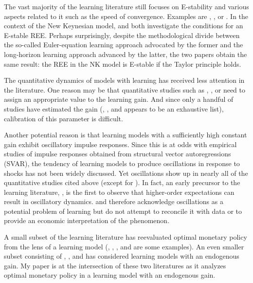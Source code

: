 \documentclass[11pt]{article}
\renewcommand{\[}{\begin{equation}}
\renewcommand{\]}{\end{equation}}
\begin{document}
The vast majority of the learning literature still focuses on E-stability and various aspects related to it such as the speed of convergence. Examples are \cite{evans2003expectations}, \cite{marcet1989convergence}, \cite{ferrero2007monetary} or \cite{eusepi2018science}. In the context of the New Keynesian model, \cite{bullard2002learning} and \cite{preston2005} both investigate the conditions for an E-stable REE. Perhaps surprisingly, despite the methodological divide between the so-called Euler-equation learning approach advocated by the former and the long-horizon learning approach advanced by the latter, the two papers obtain the same result: the REE in the NK model is E-stable if the Taylor principle holds.  

The quantitative dynamics of models with learning has received less attention in the literature. One reason may be that quantitative studies such as \cite{williams2003adaptive}, \cite{eusepi2011expectations}, \cite{LUBIK201685} or \cite{WINKLER2019} need to assign an appropriate value to the learning gain. And since only a handful of studies have estimated the gain (\cite{branch2006simple}, \cite{milani2007expectations}, \cite{eusepi2018limits} and \cite{carvalho2019anchored} appears to be an exhaustive list), calibration of this parameter is difficult.

Another potential reason is that learning models with a sufficiently high constant gain exhibit oscillatory impulse responses. Since this is at odds with empirical studies of impulse responses obtained from structural vector autoregressions (SVAR), the tendency of learning models to produce oscillations in response to shocks has not been widely discussed. Yet oscillations show up in nearly all of the quantitative studies cited above (except for \cite{williams2003adaptive}). In fact, an early precursor to the learning literature, \cite{townsend1983}, is the first to observe that higher-order expectations can result in oscillatory dynamics. \cite{evans_honkapohja2001} and \cite{evans2013bayesian} therefore acknowledge oscillations as a potential problem of learning but do not attempt to reconcile it with data or to provide an economic interpretation of the phenomenon.

A small subset of the learning literature has reevaluated optimal monetary policy from the lens of a learning model (\cite{orphanides2004imperfect}, \cite{ferrero2007monetary}, \cite{molnar2014optimal}, \cite{eusepi2018science} and \cite{eusepi2018limits} are some examples). An even smaller subset consisting of \cite{marcet2003recurrent}, \cite{milani2014learning}, and \cite{carvalho2019anchored} has considered learning models with an endogenous gain. My paper is at the intersection of these two literatures as it analyzes optimal monetary policy in a learning model with an endogenous gain. 
\end{document}
